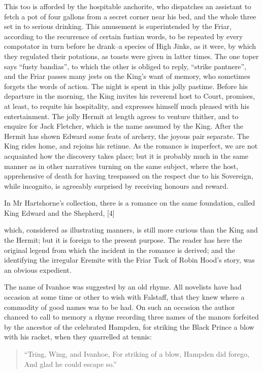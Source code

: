 This too is afforded by the hospitable anchorite, who dispatches an
assistant to fetch a pot of four gallons from a secret corner near his
bed, and the whole three set in to serious drinking. This amusement is
superintended by the Friar, according to the recurrence of certain
fustian words, to be repeated by every compotator in turn before he
drank--a species of High Jinks, as it were, by which they regulated
their potations, as toasts were given in latter times. The one toper
says ``fusty bandias'', to which the other is obliged to reply, ``strike
pantnere'', and the Friar passes many jests on the King's want of
memory, who sometimes forgets the words of action. The night is spent in
this jolly pastime. Before his departure in the morning, the King
invites his reverend host to Court, promises, at least, to requite his
hospitality, and expresses himself much pleased with his entertainment.
The jolly Hermit at length agrees to venture thither, and to enquire for
Jack Fletcher, which is the name assumed by the King. After the Hermit
has shown Edward some feats of archery, the joyous pair separate. The
King rides home, and rejoins his retinue. As the romance is imperfect,
we are not acquainted how the discovery takes place; but it is probably
much in the same manner as in other narratives turning on the same
subject, where the host, apprehensive of death for having trespassed on
the respect due to his Sovereign, while incognito, is agreeably
surprised by receiving honours and reward.

In Mr Hartshorne's collection, there is a romance on the same
foundation, called King Edward and the Shepherd, {[}4{]}

which, considered as illustrating manners, is still more curious than
the King and the Hermit; but it is foreign to the present purpose. The
reader has here the original legend from which the incident in the
romance is derived; and the identifying the irregular Eremite with the
Friar Tuck of Robin Hood's story, was an obvious expedient.

The name of Ivanhoe was suggested by an old rhyme. All novelists have
had occasion at some time or other to wish with Falstaff, that they knew
where a commodity of good names was to be had. On such an occasion the
author chanced to call to memory a rhyme recording three names of the
manors forfeited by the ancestor of the celebrated Hampden, for striking
the Black Prince a blow with his racket, when they quarrelled at tennis:

\begin{quote}
``Tring, Wing, and Ivanhoe,
For striking of a blow,
Hampden did forego,
And glad he could escape so.''
\end{quote}


